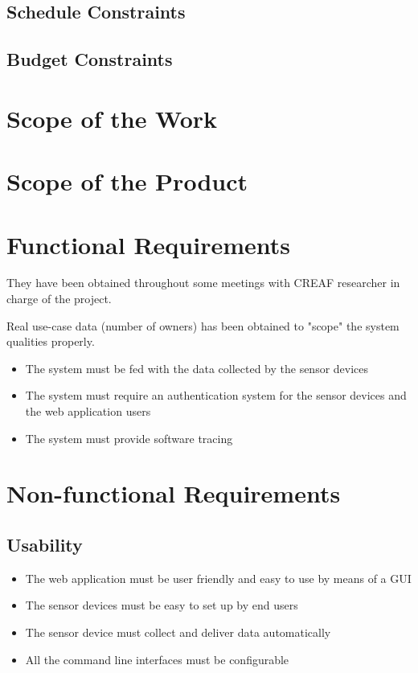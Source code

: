 \subsection{Schedule Constraints}
\subsection{Budget Constraints}

\section{Scope of the Work}
\section{Scope of the Product}

\section{Functional Requirements}

They have been obtained throughout some meetings with CREAF researcher in charge of the project.

Real use-case data (number of owners) has been obtained to "scope" the system qualities properly.

\begin{itemize}
	\item The system must be fed with the data collected by the sensor devices
	\item The system must require an authentication system for the sensor devices and the web application users
	\item The system must provide software tracing
\end{itemize}

\section{Non-functional Requirements}

\subsection*{Usability}

\begin{itemize}
	\item The web application must be user friendly and easy to use by means of a GUI
	\item The sensor devices must be easy to set up by end users
	\item The sensor device must collect and deliver data automatically
	\item All the command line interfaces must be configurable
\end{itemize}

